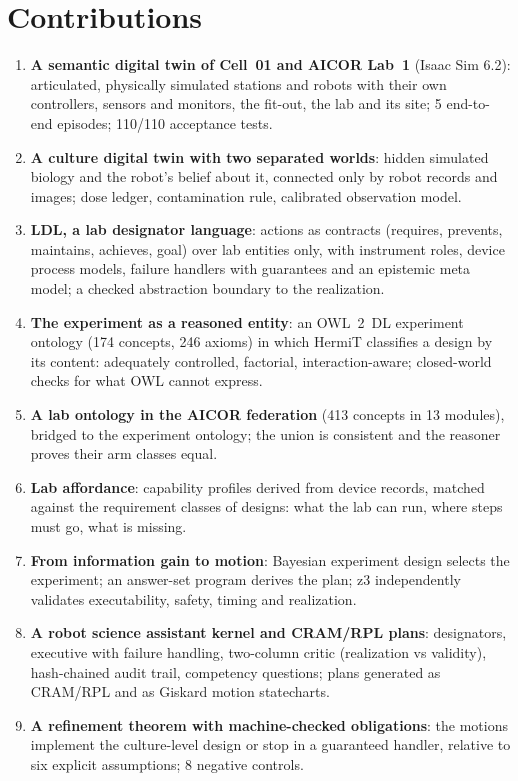 \documentclass[10.5pt,a4paper]{article}
\begin{document}
\section{Contributions}
\begin{enumerate}[label=\textbf{C\arabic*}]
\item \textbf{A semantic digital twin of Cell~01 and AICOR Lab~1} (Isaac Sim 6.2): articulated, physically simulated
stations and robots with their own controllers, sensors and monitors, the fit-out, the lab and its site;
5 end-to-end episodes; 110/110 acceptance tests.
\item \textbf{A culture digital twin with two separated worlds}: hidden simulated biology and the robot's belief about
it, connected only by robot records and images; dose ledger, contamination rule, calibrated observation model.
\item \textbf{LDL, a lab designator language}: actions as contracts (requires, prevents, maintains, achieves, goal)
over lab entities only, with instrument roles, device process models, failure handlers with guarantees and an
epistemic meta model; a checked abstraction boundary to the realization.
\item \textbf{The experiment as a reasoned entity}: an OWL~2~DL experiment ontology (174 concepts, 246 axioms) in which HermiT classifies a design by its content: adequately controlled, factorial, interaction-aware;
closed-world checks for what OWL cannot express.
\item \textbf{A lab ontology in the AICOR federation} (413 concepts in 13 modules), bridged to the experiment ontology; the union is consistent and the reasoner proves their arm classes equal.
\item \textbf{Lab affordance}: capability profiles derived from device records, matched against the requirement
classes of designs: what the lab can run, where steps must go, what is missing.
\item \textbf{From information gain to motion}: Bayesian experiment design selects the experiment; an answer-set
program derives the plan; z3 independently validates executability, safety, timing and realization.
\item \textbf{A robot science assistant kernel and CRAM/RPL plans}: designators, executive with failure handling,
two-column critic (realization vs validity), hash-chained audit trail, competency questions; plans generated as
CRAM/RPL and as Giskard motion statecharts.
\item \textbf{A refinement theorem with machine-checked obligations}: the motions implement the culture-level design
or stop in a guaranteed handler, relative to six explicit assumptions; 8 negative controls.
\end{enumerate}
\end{document}
